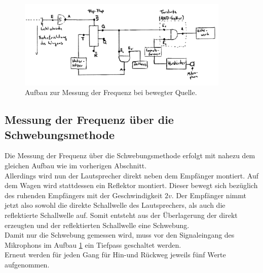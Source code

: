 \begin{figure}
	\includegraphics[width=0.9\textwidth]{Bilder/frequenzmessung_schaltung.png}
	\caption{Aufbau zur Messung der Frequenz bei bewegter Quelle.}
	\label{fig:delphin}
\end{figure}

\FloatBarrier
\subsection{Messung der Frequenz über die Schwebungsmethode}
Die Messung der Frequenz über die Schwebungsmethode erfolgt mit nahezu dem gleichen Aufbau wie im vorherigen Abschnitt.\\
Allerdings wird nun der Lautsprecher direkt neben dem Empfänger montiert.
Auf dem Wagen wird stattdessen ein Reflektor montiert. Dieser bewegt sich bezüglich des ruhenden Empfängers mit der Geschwindigkeit $2v$.
Der Empfänger nimmt jetzt also sowohl die direkte Schallwelle des Lautsprechers, als auch die reflektierte Schallwelle auf.
Somit entsteht aus der Überlagerung der direkt erzeugten und der reflektierten Schallwelle eine Schwebung.\\
Damit nur die Schwebung gemessen wird, muss vor den Signaleingang des Mikrophons im Aufbau \ref{fig:delphin} ein Tiefpass geschaltet werden.\\
Erneut werden für jeden Gang für Hin-und Rückweg jeweils fünf Werte aufgenommen.
